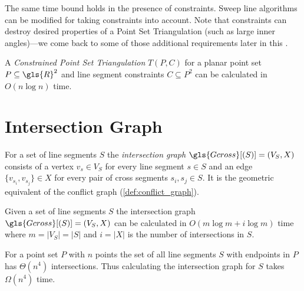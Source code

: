 The same time bound holds in the presence of constraints. Sweep line 
algorithms can be modified for taking constraints into account. Note
that constraints can destroy desired properties of a Point Set
Triangulation (such as large inner angles)---we come back to some of
those additional requirements later in this
.

\begin{theorem}
  A \emph{Constrained Point Set Triangulation} \(T(P, C)\)
  for a planar point set \(P \subseteq \gls{R}^2\)
  and line segment constraints \(C \subseteq P^2\)
  can be calculated in \(O(n \log n)\) time.
  \cite{constrained_triangulation}
\end{theorem}

\section{Intersection Graph}
\label{sec:intersection_graph}



\begin{definition}
  \label{def:intersection_graph}
  For a set of line segments \(S\) the \emph{intersection graph}
  \(\gls{Gcross}[(S)] = (V_S,X)\) consists of a vertex \(v_s \in V_S\)
  for every line segment \(s \in S\) and an edge
  \(\{v_{s_i}, v_{s_j}\} \in X\) for every pair of \gls{cross}
  segments \(s_i, s_j \in S\). It is the geometric equivalent of the
  conflict graph (\cref{def:conflict_graph}).
\end{definition}


\begin{theorem}
  \label{thm:sweep_bound}
  Given a set of line segments \(S\) the intersection graph
  \(\gls{Gcross}[(S)] = (V_S,X)\) can be calculated in
  \(O(m \log m + i \log m)\) time where \(m = |V_S| = |S|\) 
  and \(i = |X|\) is the number of intersections in \(S\).
  \cite[Lemma 2.3]{deberg_compgeom}
\end{theorem}


\begin{theorem}
  \label{thm:point_set_intersections}
  For a point set \(P\) with \(n\) points the set of all line 
  segments \(S\) with endpoints in \(P\) has \(\Theta(n^4)\) 
  intersections. \cite{quadrilaterals_bound} Thus calculating the
  intersection graph for \(S\)  takes \(\Omega(n^4)\) time.
\end{theorem}


